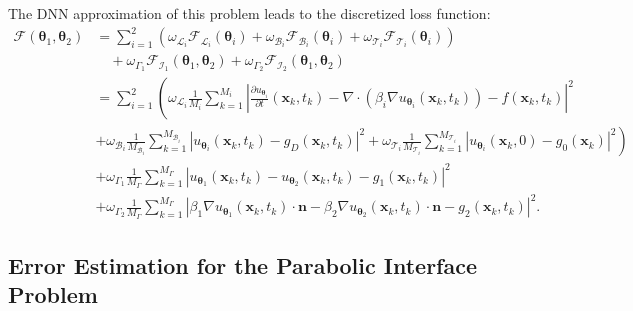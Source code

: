 \documentclass{article}
\begin{document}
The DNN approximation of this problem leads to the discretized loss function:
\begin{equation}
    \begin{aligned}
\mathcal{F}(\boldsymbol{\theta}_1, \boldsymbol{\theta}_2) &= \sum_{i=1}^{2} \left(\omega_{\mathcal{L}_i} \mathcal{F}_{\mathcal{L}_i}(\boldsymbol{\theta}_i) + \omega_{\mathcal{B}_i} \mathcal{F}_{\mathcal{B}_i}(\boldsymbol{\theta}_i) + \omega_{\mathcal{T}_i} \mathcal{F}_{\mathcal{T}_i}(\boldsymbol{\theta}_i) \right)\\
&\quad + \omega_{\Gamma_1} \mathcal{F}_{\mathcal{I}_1}(\boldsymbol{\theta}_1, \boldsymbol{\theta}_2) + \omega_{\Gamma_2} \mathcal{F}_{\mathcal{I}_2}(\boldsymbol{\theta}_1, \boldsymbol{\theta}_2) \\
&= \sum_{i=1}^{2} \left(\omega_{\mathcal{L}_i} \frac{1}{M_{i}} \sum_{k=1}^{M_{i}} \left|\frac{\partial u_{\boldsymbol{\theta}_i}}{\partial t}(\boldsymbol{x}_k,t_k) - \nabla \cdot (\beta_i \nabla u_{\boldsymbol{\theta}_i}(\boldsymbol{x}_k,t_k)) - f(\boldsymbol{x}_k,t_k)\right|^2 \right.\\
&\left.+ \omega_{\mathcal{B}_i} \frac{1}{M_{\mathcal{B}_i}} \sum_{k=1}^{M_{\mathcal{B}_i}} \left|u_{\boldsymbol{\theta}_i}(\boldsymbol{x}_k,t_k) - g_D(\boldsymbol{x}_k,t_k)\right|^2 + \omega_{\mathcal{T}_i} \frac{1}{M_{\mathcal{T}_i}} \sum_{k=1}^{M_{\mathcal{T}_i}} \left|u_{\boldsymbol{\theta}_i}(\boldsymbol{x}_k,0) - g_0(\boldsymbol{x}_k)\right|^2\right)\\
&+ \omega_{\Gamma_1} \frac{1}{M_{\Gamma}} \sum_{k=1}^{M_{\Gamma}} \left|u_{\boldsymbol{\theta}_1}(\boldsymbol{x}_k,t_k) - u_{\boldsymbol{\theta}_2}(\boldsymbol{x}_k,t_k) - g_1(\boldsymbol{x}_k,t_k)\right|^2 \\
&+ \omega_{\Gamma_2} \frac{1}{M_{\Gamma}} \sum_{k=1}^{M_{\Gamma}} \left|\beta_1 \nabla u_{\boldsymbol{\theta}_1}(\boldsymbol{x}_k,t_k) \cdot \boldsymbol{n} - \beta_2 \nabla u_{\boldsymbol{\theta}_2}(\boldsymbol{x}_k,t_k) \cdot \boldsymbol{n} - g_2(\boldsymbol{x}_k,t_k)\right|^2.
\end{aligned}
\end{equation}

\subsection{Error Estimation for the Parabolic Interface Problem}
\end{document}
